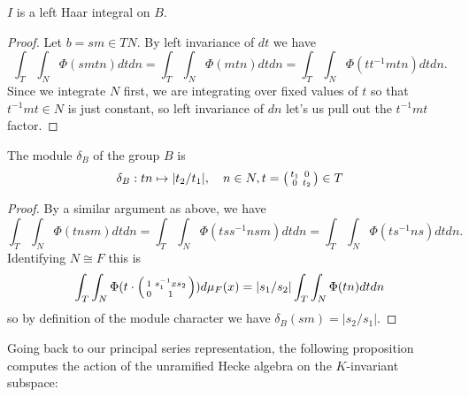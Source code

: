 \begin{prop}
    $I$ is a left Haar integral on $B$.
\end{prop}
\begin{proof}
    Let $b=sm \in TN$. By left invariance of $dt$ we have
    $$\int_T\int_N \Phi(smtn)dtdn = \int_T\int_N \Phi(mtn)dtdn = \int_T\int_N \Phi(tt^{-1}mtn)dtdn.$$
    Since we integrate $N$ first, we are integrating over fixed values of $t$ so that $t^{-1}mt \in N$ is just constant, so left invariance of $dn$ let's us pull out the $t^{-1}mt$ factor.
\end{proof}

\begin{prop}
    The module $\delta_B$ of the group $B$ is
    $$\delta_B : tn \mapsto |t_2/t_1|, \quad n \in N, t = \begin{psmallmatrix}
        t_1 & 0 \\ 0 & t_2
    \end{psmallmatrix} \in T$$
\end{prop}
\begin{proof}
    By a similar argument as above, we have
    $$\int_T\int_N \Phi(tnsm) dtdn = \int_T\int_N \Phi(tss^{-1}nsm)dtdn = \int_T\int_N \Phi(ts^{-1}ns) dt dn.$$ Identifying $N \cong F$ this is
    $$\int_T\int_N \Phi(t \cdot \begin{psmallmatrix}
        1 & s_1^{-1}xs_2 \\0&1 
    \end{psmallmatrix}) d\mu_F(x) = |s_1/s_2|\int_T\int_N\Phi(tn)dtdn$$
    so by definition of the module character we have $\delta_B(sm) = |s_2/s_1|$.
\end{proof}

Going back to our principal series representation, the following proposition computes the action of the unramified Hecke algebra on the $K$-invariant subspace:

